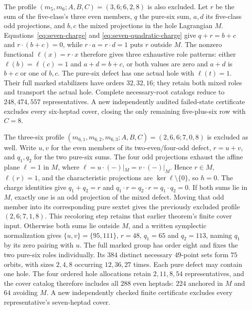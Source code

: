 The profile $(m_5,m_6;A,B,C)=(3,6;6,2,8)$ is also excluded.
Let $r$ be the sum of the five-class's three even members,
$q$ the pure-six sum, $a,d$ its five-class odd projections,
and $b,c$ the mixed projections in the hole Lagrangian $M$.
Equations~\eqref{eq:seven-charge} and
\eqref{eq:seven-quadratic-charge} give
$q+r=b+c$ and $r\cdot(b+c)=0$, while
$r\cdot a=r\cdot d=1$ puts $r$ outside $M$.
The nonzero functional $\ell(x)=r\cdot x$ therefore gives three
exhaustive role patterns: either $\ell(b)=\ell(c)=1$ and
$a+d=b+c$, or both values are zero and $a+d$ is $b+c$ or
one of $b,c$. The pure-six defect has one actual hole with
$\ell(t)=1$. Their full marked stabilizers have orders $32,32,16$;
they retain both mixed roles and transport the actual hole.
Complete necessary-root catalogs reduce to $248,474,557$
representatives. A new independently audited failed-state
certificate excludes every six-heptad cover, closing the only
remaining five-plus-six row with $C=8$.

The three-six profile
$(m_{6,1},m_{6,2},m_{6,3};A,B,C)=(2,6,6;7,0,8)$ is excluded as well.
Write $u,v$ for the even members of its two-even/four-odd defect,
$r=u+v$, and $q_1,q_2$ for the two pure-six sums. The four odd
projections exhaust the affine plane $\ell=1$ in $M$, where
$\ell=u\cdot(-)|_M=v\cdot(-)|_M$. Hence $r\in M$, $\ell(r)=1$,
and the characteristic projections are $\ker\ell\setminus\{0\}$,
so $h=0$. The charge identities give $q_1+q_2=r$ and
$q_1\cdot r=q_2\cdot r=q_1\cdot q_2=0$.
If both sums lie in $M$, exactly one is an odd projection of the
mixed defect. Moving that odd member into its corresponding pure
sextet gives the previously excluded profile $(2,6;7,1,8)$.
This recoloring step retains that earlier theorem's finite cover input.
Otherwise both sums lie outside $M$, and a written symplectic
normalization gives $\{u,v\}=\{95,111\}$, $r=48$,
$q_1=65$ and $q_2=113$, naming $q_1$ by its zero pairing with $u$.
The full marked group has order eight and fixes the two pure-six
roles individually. Its $384$ distinct necessary $49$-point sets
form $75$ orbits, with sizes $2,4,8$ occurring $12,36,27$ times.
Each pure defect may contain one hole. The four ordered hole
allocations retain $2,11,8,54$ representatives, and the cover
catalog therefore includes all $288$ even heptads: $224$ anchored
in $M$ and $64$ avoiding $M$. A new independently checked finite
certificate excludes every representative's seven-heptad cover.

